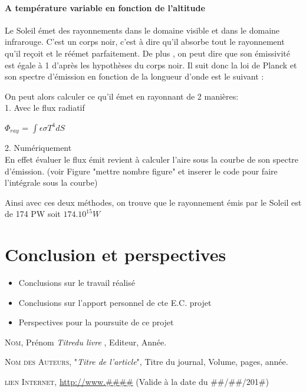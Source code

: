 \documentclass[a4paper, 12pt]{report} %
\begin{document}
\subsubsection{A température variable en fonction de l'altitude}

Le Soleil émet des rayonnements dans le domaine visible et 
dans le domaine infrarouge. C'est un corps noir, c'est à dire
qu'il absorbe tout le rayonnement qu'il reçoit et le réémet 
parfaitement. De plus , on peut dire que son émissivité est 
égale à 1 d'après les hypothèses du corps noir. Il suit donc
la loi de Planck et son spectre d'émission en fonction de 
la longueur d'onde est le suivant :


On peut alors calculer ce qu'il émet en rayonnant de 2 manières: \\
1. Avec le flux radiatif
\begin{center}
$\Phi_{ray}$ = $\int \epsilon \sigma T^{4} dS$    
\end{center}
2. Numériquement \\
En effet évaluer le flux émit revient à calculer l'aire sous la courbe 
de son spectre d'émission. (voir Figure  "mettre nombre figure" et inserer 
le code pour faire l'intégrale sous la courbe) \vspace{\baselineskip}

Ainsi avec ces deux méthodes, on trouve que le rayonnement émis par le Soleil 
est de 174 PW  soit $174.10^{15} W$

\chapter*{Conclusion et perspectives} %
\begin{itemize}
\item Conclusions sur le travail réalisé
\item Conclusions sur l'apport personnel de cte E.C. projet
\item Perspectives pour la poursuite de ce projet
\end{itemize}


\begin{thebibliography}{99} %

\textsc{Nom}, Prénom
\textit{Titredu livre },
Editeur, Année.

\textsc{Nom des Auteurs},
"\textit{Titre de l'article}",
Titre du journal,
Volume, pages, année.

\textsc{lien Internet},
\url{http://www.\#\#\#\#}
(Valide à la date du \#\#/\#\#/201\#)

\end{thebibliography}
\end{document}
